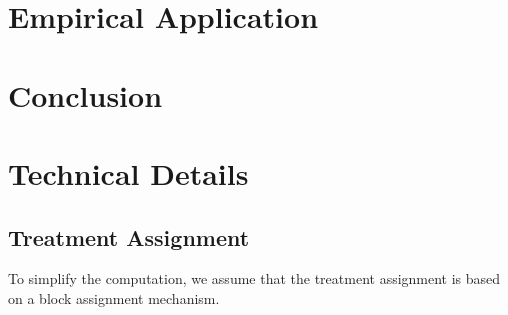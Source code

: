 \documentclass[12pt]{article}
\begin{document}
\section{Empirical Application}
\label{sec: application}


\section{Conclusion} 
\label{sec: conclusion}


\clearpage
\begingroup
{}


\endgroup

\clearpage
\appendix
{}
\renewcommand{\theequation}{\thesection.\arabic{equation}}
\setcounter{equation}{0}
\renewcommand{\theassumption}{\thesection.\arabic{assumption}}
\setcounter{assumption}{1}
\renewcommand{\thefigure}{\thesection.\arabic{figure}}
\setcounter{figure}{0}

\section{Technical Details}
\label{sec: appendix}

\subsection{Treatment Assignment}
\label{app: treatment assignment}

To simplify the computation, we assume that the treatment assignment is based on a block assignment mechanism. 
\end{document}
